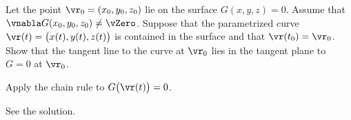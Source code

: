 \begin{question}\label{tan_line_plane}
Let the point $\vr_0= (x_0,y_0,z_0)$ lie on the surface $G(x,y,z)=0$.
Assume that $\vnabla G(x_0,y_0,z_0)\ne\vZero$. Suppose that the 
parametrized curve $\vr(t)=\big(x(t),y(t),z(t)\big)$ is contained in the surface
and that $\vr(t_0)=\vr_0$. Show that the tangent line to the curve at $\vr_0$
lies in the tangent plane to $G=0$ at $\vr_0$.

\end{question}

\begin{hint}
Apply the chain rule to $G\big(\vr(t)\big)=0$.
\end{hint}

\begin{answer}
See the solution.
\end{answer}


